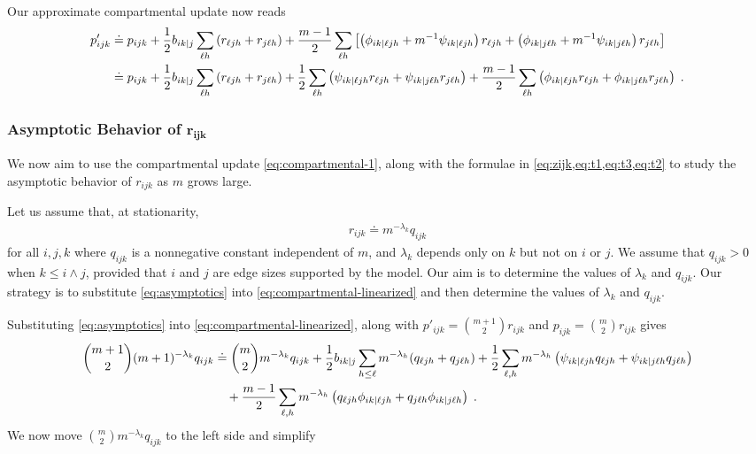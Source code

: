 Our approximate compartmental update now reads 
\begin{align}
    p'_{ijk} &\doteq p_{ijk} + {\frac{1}{2}}b_{ik|j}\sum_{\ell h} \left(r_{\ell j h} + r_{j\ell h}\right) + \frac{m-1}{2} \sum_{\ell h} \left[ \left(\phi_{ik|\ell j h} + m^{-1} \psi_{ik|\ell j h}\right) r_{\ell j h} + \left(\phi_{ik|j \ell h} + m^{-1} \psi_{ik|j \ell h}\right) r_{j \ell h}\right] \\ 
    &\doteq p_{ijk} + {\frac{1}{2}}b_{ik|j}\sum_{\ell h} \left(r_{\ell j h} + r_{j\ell h}\right) + \frac{1}{2}\sum_{\ell h} \left(\psi_{ik|\ell j h} r_{\ell jh} + \psi_{ik|j \ell h}r_{j \ell h}\right) + \frac{m-1}{2}\sum_{\ell h} \left(\phi_{ik|\ell j h}r_{\ell j h} + \phi_{ik|j \ell h}r_{j\ell h}\right) \;. \label{eq:compartmental-linearized}
\end{align}

\subsubsection{Asymptotic Behavior of $\mathbf{r_{ijk}}$}

We now aim to use the compartmental update \cref{eq:compartmental-1}, along with the formulae in \cref{eq:zijk,eq:t1,eq:t3,eq:t2} to study the asymptotic behavior of $r_{ijk}$ as $m$ grows large.  

Let us assume that, at stationarity,  
\begin{align}
    r_{ijk} \doteq m^{-\lambda_k} q_{ijk} \label{eq:asymptotics}
\end{align}
for all $i, j, k$ where $q_{ijk}$ is a nonnegative constant independent of $m$, and $\lambda_k$ depends only on $k$ but not on $i$ or $j$. 
We assume that $q_{ijk} > 0$ when $k \leq i \land j$, provided that $i$ and $j$ are edge sizes supported by the model.  
Our aim is to determine the values of $\lambda_k$ and $q_{ijk}$. 
Our strategy is to substitute \cref{eq:asymptotics} into \cref{eq:compartmental-linearized} and then determine the values of $\lambda_k$ and $q_{ijk}$. 

Substituting \cref{eq:asymptotics} into \cref{eq:compartmental-linearized}, along with $p'_{ijk} = \binom{m+1}{2}r_{ijk}$ and $p_{ijk} = \binom{m}{2}r_{ijk}$ gives 
\begin{align}
    \binom{m+1}{2}(m+1)^{-\lambda_k}q_{ijk} &\doteq \binom{m}{2}m^{-\lambda_k}q_{ijk} + \frac{1}{2}b_{ik|j} \sum_{h\leq \ell} m^{-\lambda_h} (q_{\ell jh} + q_{j\ell h}) + \frac{1}{2}\sum_{\ell, h } m^{-\lambda_h}\left(\psi_{ik|\ell j h} q_{\ell jh} + \psi_{ik|j \ell h}q_{j \ell h}\right) \nonumber\\
        &\quad  + \frac{m-1}{2}\sum_{\ell, h} m^{-\lambda_h} \left(q_{\ell j h} \phi_{ik|\ell jh} + q_{j \ell h} \phi_{ik|j\ell h}\right)\;.
\end{align}
We now move $\binom{m}{2}m^{-\lambda_k}q_{ijk}$ to the left side and simplify 

